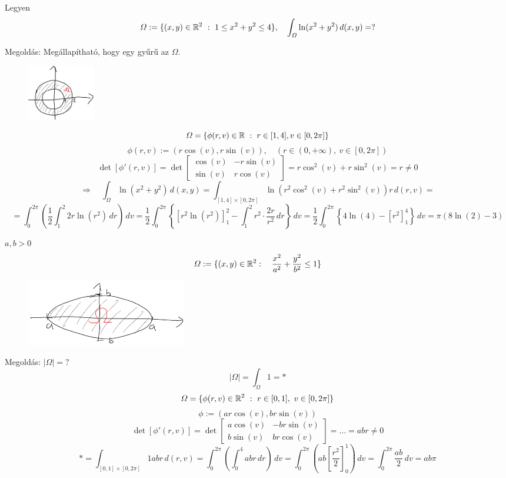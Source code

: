 \documentclass[a4paper,11.5pt]{article}
\begin{document}
	\begin{task}
		Legyen
		\[ \varOmega:=\{ (x,y)\in\R^2\ : \ 1\leq x^2+y^2\leq4 \},\quad \int_{\varOmega}^{}\ln(x^2+y^2)\,d(x,y)=? \]
		
		Megoldás: Megállapítható, hogy egy gyűrű az $\varOmega$.
		\begin{figure}[H]
			\centering
			\includegraphics[width=3cm]{kepek/03.png}
			\caption{}
		\end{figure}
		
		\[ \varOmega=\{ \phi(r,v)\in\R\ :\ r\in[1,4],v\in[0,2\pi] \} \]
		\[ \phi(r,v):=\left(r\cos(v),r\sin(v)\right),\quad (r\in(0,+\infty),\ v\in[0,2\pi]) \]
		\[ \det[\phi'(r,v)]=\det \begin{bmatrix}
			\cos(v)&-r\sin(v)\\
			\sin(v)&r\cos(v)
		\end{bmatrix}=r\cos^2(v)+r\sin^2(v)=r\not=0 \]
		\[\Rightarrow\quad \int_{\varOmega}^{}\ln(x^2+y^2)\,d(x,y)=\int_{[1,4]\times[0,2\pi]}^{}\ln(r^2\cos^2(v)+r^2\sin^2(v))r\,d(r,v)=\]
		\[=\int_{0}^{2\pi}\left(\frac{1}{2}\int_{1}^{2}2r\ln(r^2)\,dr\right)\,dv=\frac{1}{2}\int_{0}^{2\pi}\left\{[r^2\ln(r^2)]_1^2-\int_{1}^{2}r^2\cdot\frac{2r}{r^2}\,dr\right\}\,dv=\frac{1}{2}\int_0^{2\pi}\left\{4\ln(4)-[r^2]_1^4 \right\}\,dv=\pi(8\ln(2)-3) \] 
	\end{task}
	\begin{task}
		$a,b>0$
		\[ \varOmega:=\{ (x,y)\in\mathbb{R}^2:\quad \frac{x^2}{a^2}+\frac{y^2}{b^2}\leq1 \} \]
		\begin{figure}[h]
			\centering
			\includegraphics[width=7cm]{kepek/04.png}
			\caption{}
		\end{figure}
		
		Megoldás: $|\varOmega|=?$
		\[ |\varOmega|=\int_{\varOmega}^{}1=* \]
		\[ \varOmega=\{ \phi(r,v)\in\R^2\ : \ r\in[0,1],\ v\in[0,2\pi] \} \]
		\[ \phi:=(ar\cos(v),br\sin(v)) \]
		\[ \det[\phi'(r,v)]=\det \begin{bmatrix}
			a\cos(v)&-br\sin(v)\\
			b\sin(v)&br\cos(v)
		\end{bmatrix}=\ldots=abr\not=0 \]
		\[ *=\int_{[0,1]\times[0,2\pi]}^{}1abr\,d(r,v)=\int_{0}^{2\pi}\left(\int_0^4abr\,dr\right)\,dv=\int_0^{2\pi}\left(ab\left[\frac{r^2}{2}\right]_0^1\right)\,dv=\int_0^{2\pi}\frac{ab}{2}\,dv=ab\pi \]
	\end{task}
\end{document}
